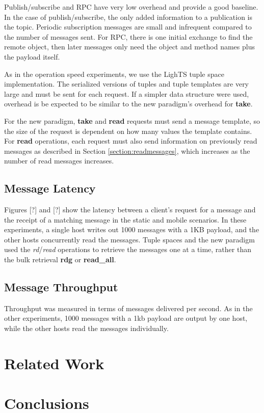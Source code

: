 \documentclass[lnicst]{svmultln}
\begin{document}
Publish/subscribe and RPC have very low overhead and provide a good baseline. In the case of publish/subscribe, the only added information to a publication is the topic. Periodic subscription messages are small and infrequent compared to the number of messages sent. For RPC, there is one initial exchange to find the remote object, then later messages only need the object and method names plus the payload itself.

As in the operation speed experiments, we use the LighTS tuple space implementation. The serialized versions of tuples and tuple templates are very large and must be sent for each request. If a simpler data structure were used, overhead is be expected to be similar to the new paradigm's overhead for \textbf{take}.

For the new paradigm, \textbf{take} and \textbf{read} requests must send a message template, so the size of the request is dependent on how many values the template contains. For \textbf{read} operations, each request must also send information on previously read messages as described in Section \ref{section:readmessages}, which increases as the number of read messages increases.

\subsection{Message Latency}

Figures [?] and [?] show the latency between a client's request for a message and the receipt of a matching message in the static and mobile scenarios. In these experiments, a single host writes out 1000 messages with a 1KB payload, and the other hosts concurrently read the messages. Tuple spaces and the new paradigm used the \textit{rd}/\textit{read} operations to retrieve the messages one at a time, rather than the bulk retrieval \textbf{rdg} or \textbf{read_all}.



\subsection{Message Throughput}

Throughput was measured in terms of messages delivered per second. As in the other experiments, 1000 messages with a 1kb payload are output by one host, while the other hosts read the messages individually.


\section{Related Work}


\section{Conclusions}




\end{document}
